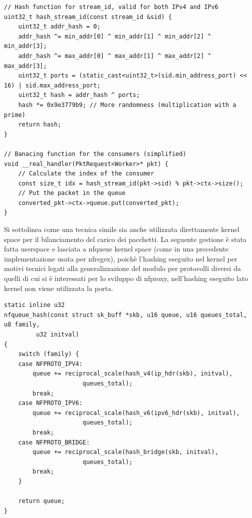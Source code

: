 \begin{listing}[H]
    \begin{verbatim}
// Hash function for stream_id, valid for both IPv4 and IPv6
uint32_t hash_stream_id(const stream_id &sid) {
    uint32_t addr_hash = 0;
    addr_hash ^= min_addr[0] ^ min_addr[1] ^ min_addr[2] ^ min_addr[3];
    addr_hash ^= max_addr[0] ^ max_addr[1] ^ max_addr[2] ^ max_addr[3];
    uint32_t ports = (static_cast<uint32_t>(sid.min_address_port) << 16) | sid.max_address_port;
    uint32_t hash = addr_hash ^ ports;
    hash *= 0x9e3779b9; // More randomness (multiplication with a prime)
    return hash;
}

// Banacing function for the consumers (simplified)
void __real_handler(PktRequest<Worker>* pkt) {
    // Calculate the index of the consumer
    const size_t idx = hash_stream_id(pkt->sid) % pkt->ctx->size();
    // Put the packet in the queue
    converted_pkt->ctx->queue.put(converted_pkt);
}
\end{verbatim}
\end{listing}

Si sottolinea come una tecnica simile sia anche utilizzata direttamente kernel space per il bilanciamento del carico dei pacchetti.
La seguente gestione è stata fatta userspace e lasciata a nfqueue kernel space (come in una precedente implementazione usata per nfregex),
poichè l'hashing eseguito nel kernel per motivi tecnici legati alla generalizzazione del modulo per protocolli diversi da quelli di cui
si è interessati per lo sviluppo di nfproxy, nell'hashing eseguito lato kernel non viene utilizzata la porta.

\begin{listing}[H]
    \begin{verbatim}
static inline u32
nfqueue_hash(const struct sk_buff *skb, u16 queue, u16 queues_total, u8 family,
	     u32 initval)
{
	switch (family) {
	case NFPROTO_IPV4:
		queue += reciprocal_scale(hash_v4(ip_hdr(skb), initval),
					  queues_total);
		break;
	case NFPROTO_IPV6:
		queue += reciprocal_scale(hash_v6(ipv6_hdr(skb), initval),
					  queues_total);
		break;
	case NFPROTO_BRIDGE:
		queue += reciprocal_scale(hash_bridge(skb, initval),
					  queues_total);
		break;
	}

	return queue;
}
\end{verbatim}
\end{listing}


